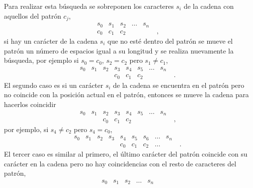 \begin{itemize}
\begin{solution}
        Para realizar esta búsqueda se sobreponen los caracteres $s_i$ de la cadena con aquellos del patrón $c_j$,
        \begin{equation*}
            \begin{matrix}
                s_0 & s_1 & s_2 & \ldots & s_n \\
                c_0 & c_1 & c_2 & & \qquad ,
            \end{matrix}
        \end{equation*}
        si hay un carácter de la cadena $s_i$ que no esté dentro del patrón se mueve el patrón un número de espacios igual a su longitud y se realiza nuevamente la búsqueda, por ejemplo si $s_0 = c_0$, $s_2 = c_2$ pero $s_1 \neq c_1$,
        \begin{equation*}
            \begin{matrix}
                s_0 & s_1 & s_2 & s_3 & s_4 & s_5 & \ldots & s_n \\
                & & & c_0 & c_1 & c_2 & & \qquad .
            \end{matrix}
        \end{equation*}
        El segundo caso es si un carácter $s_i$ de la cadena se encuentra en el patrón pero no coincide con la posición actual en el patrón, entonces se mueve la cadena para hacerlos coincidir
        \begin{equation*}
            \begin{matrix}
                s_0 & s_1 & s_2 & s_3 & s_4 & s_5 & \ldots & s_n \\
                & & c_0 & c_1 & c_2 & & & \qquad ,
            \end{matrix}
        \end{equation*}
        por ejemplo, si $s_4 \neq c_2$ pero $s_4 = c_0$,
        \begin{equation*}
            \begin{matrix}
                s_0 & s_1 & s_2 & s_3 & s_4 & s_5 & s_6 & \ldots & s_n \\
                & & & & c_0 & c_1 & c_2 & \ldots & \qquad .
            \end{matrix}
        \end{equation*}
        El tercer caso es similar al primero, el último carácter del patrón coincide con su carácter en la cadena pero no hay coincidencias con el resto de caracteres del patrón,
        \begin{equation*}
            \begin{matrix}
                s_0 & s_1 & s_2 & \ldots & s_n \\

\end{matrix}
\end{equation*}
\end{solution}
\end{itemize}
